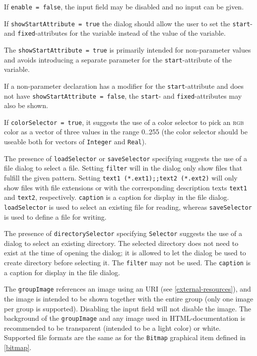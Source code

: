 \begin{annotationdefinition}[Dialog]
\begin{semantics}
If \lstinline!enable = false!, the input field may be disabled and no input can be given.

If \lstinline!showStartAttribute = true! the dialog should allow the user to set the \lstinline!start!- and \lstinline!fixed!-attributes for the variable instead of the value of the variable.

\begin{nonnormative}
The \lstinline!showStartAttribute = true! is primarily intended for non-parameter values and avoids introducing a separate parameter for the \lstinline!start!-attribute of the variable.
\end{nonnormative}

If a non-parameter declaration has a modifier for the \lstinline!start!-attribute and does not have \lstinline!showStartAttribute = false!, the \lstinline!start!- and \lstinline!fixed!-attributes may also be shown.

If \lstinline!colorSelector = true!, it suggests the use of a color selector to pick an \textsc{rgb} color as a vector of three values in the range 0..255 (the color selector should be useable both for vectors of \lstinline!Integer! and \lstinline!Real!).

The presence of \lstinline!loadSelector! or \lstinline!saveSelector! specifying  suggests the use of a file dialog to select a file.
Setting \lstinline!filter! will in the dialog only show files that fulfill the given pattern.
Setting \lstinline!text1 (*.ext1);;text2 (*.ext2)! will only show files with file extensions  or  with the corresponding description texts \lstinline!text1! and \lstinline!text2!, respectively.
\lstinline!caption! is a caption for display in the file dialog.
\lstinline!loadSelector! is used to select an existing file for reading, whereas \lstinline!saveSelector! is used to define a file for writing.

The presence of \lstinline!directorySelector! specifying \lstinline!Selector! suggests the use of a dialog to select an existing directory.
The selected directory does not need to exist at the time of opening the dialog; it is allowed to let the dialog be used to create directory before selecting it.
The \lstinline!filter! may not be used.
The \lstinline!caption! is a caption for display in the file dialog.

The \lstinline!groupImage! references an image using an URI (see \cref{external-resources}), and the image is intended to be shown together with the entire group (only one image per group is supported).
Disabling the input field will not disable the image.
The background of the \lstinline!groupImage! and any image used in HTML-documentation is recommended to be transparent (intended to be a light color) or white.
Supported file formats are the same as for the \lstinline!Bitmap! graphical item defined in \cref{bitmap}.


\end{semantics}
\end{annotationdefinition}
